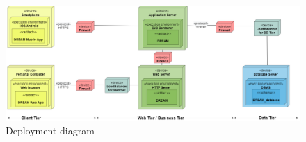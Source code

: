 \begin{landscape}
\begin{figure}[h]
\vspace*{-2cm}
\noindent
\centering
\centerline{\includegraphics[scale = 0.6]{./Images/Deployment diagram.png}}
    \caption{Deployment diagram}
    \vspace*{-12cm}
\end{figure}
\fillandplacepagenumber
\end{landscape}



